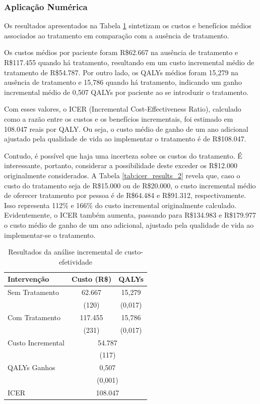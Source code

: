 \documentclass[12pt]{article}
\theoremstyle{break}
\begin{document}
\subsubsection{Aplicação Numérica}

Os resultados apresentados na Tabela \ref{tab:icer_results} sintetizam os custos e benefícios médios associados ao tratamento em comparação com a ausência de tratamento. 

Os custos médios por paciente foram R\$62.667 na ausência de tratamento e R\$117.455 quando há tratamento, resultando em um custo incremental médio de tratamento de R\$54.787. Por outro lado, os QALYs médios foram 15,279 na ausência de tratamento e 15,786 quando há tratamento, indicando um ganho incremental médio de 0,507 QALYs por paciente ao se introduzir o tratamento.

Com esses valores, o ICER (Incremental Cost-Effectiveness Ratio), calculado como a razão entre os custos e os benefícios incrementais, foi estimado em 108.047 reais por QALY. Ou seja, o custo médio de ganho de um ano adicional ajustado pela qualidade de vida ao implementar o tratamento é de R\$108.047.

Contudo, é possível que haja uma incerteza sobre os custos do tratamento. É interessante, portanto, considerar a possibilidade deste exceder os R\$12.000 originalmente considerados. A Tabela \ref{tab:icer_results_2} revela que, caso o custo do tratamento seja de R\$15.000 ou de R\$20.000, o custo incremental médio de oferecer tratamento por pessoa é de R\$64.484 e R\$91.312, respectivamente. Isso representa 112\% e 166\% do custo incremental originalmente calculado. Evidentemente, o ICER também aumenta, passando para R\$134.983 e R\$179.977 o custo médio de ganho de um ano adicional, ajustado pela qualidade de vida ao implementar-se o tratamento.

\begin{table}[H] 
\centering 
\renewcommand{\arraystretch}{1.5}
\caption{Resultados da análise incremental de custo-efetividade}
\label{tab:icer_results}
\begin{tabular}{lcc} 
\hline 
\hline 
Intervenção & Custo (R\$) & QALYs \\ 
\hline 
Sem Tratamento & 62.667 & 15,279 \\ 
               & (120)   & (0,017) \\ 
Com Tratamento & 117.455 & 15,786 \\ 
               & (231)   & (0,017) \\ 
\hline 
Custo Incremental & \multicolumn{2}{c}{54.787} \\ 
                  & \multicolumn{2}{c}{(117)} \\ 
QALYs Ganhos      & \multicolumn{2}{c}{0,507} \\ 
                  & \multicolumn{2}{c}{(0,001)} \\ 
ICER              & \multicolumn{2}{c}{108.047} \\ 
\hline 
\hline 
\end{tabular} 
\end{table}
\end{document}
